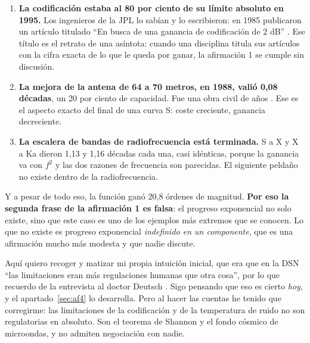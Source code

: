 \documentclass[11pt,letterpaper]{article}
\begin{document}
\begin{enumerate}
\item \textbf{La codificación estaba al 80 por ciento de su límite absoluto en
  1995.} Los ingenieros de la JPL lo sabían y lo escribieron: en 1985
  publicaron un artículo titulado \enquote{En busca de una ganancia de
  codificación de 2 dB} \parencite[véase la bibliografía
  de][]{layland1997}. Ese título es el retrato de una asíntota: cuando una
  disciplina titula sus artículos con la cifra exacta de lo que le queda por
  ganar, la afirmación 1 se cumple sin discusión.
\item \textbf{La mejora de la antena de 64 a 70 metros, en 1988, valió 0,08
  décadas}, un 20 por ciento de capacidad. Fue una obra civil de años
  \parencite{layland1997}. Ese es el aspecto exacto del final de una curva S:
  coste creciente, ganancia decreciente.
\item \textbf{La escalera de bandas de radiofrecuencia está terminada.} S a X
  y X a Ka dieron 1,13 y 1,16 décadas cada una, casi idénticas, porque la
  ganancia va con $f^2$ y las dos razones de frecuencia son parecidas. El
  siguiente peldaño no existe dentro de la radiofrecuencia.
\end{enumerate}

Y a pesar de todo eso, la función ganó 20,8 órdenes de magnitud. \textbf{Por
eso la segunda frase de la afirmación 1 es falsa}: el progreso exponencial no
solo existe, sino que este caso es uno de los ejemplos más extremos que se
conocen. Lo que no existe es progreso exponencial \emph{indefinido en un
componente}, que es una afirmación mucho más modesta y que nadie discute.

Aquí quiero recoger y matizar mi propia intuición inicial, que era que en la
DSN \enquote{las limitaciones eran más regulaciones humanas que otra cosa},
por lo que recuerdo de la entrevista al doctor Deutsch \parencite{deutsch2026}.
Sigo pensando que eso es cierto \emph{hoy}, y el apartado~\ref{sec:af4} lo
desarrolla. Pero al hacer las cuentas he tenido que corregirme: las
limitaciones de la codificación y de la temperatura de ruido no son
regulatorias en absoluto. Son el teorema de Shannon y el fondo cósmico de
microondas, y no admiten negociación con nadie.
\end{document}
